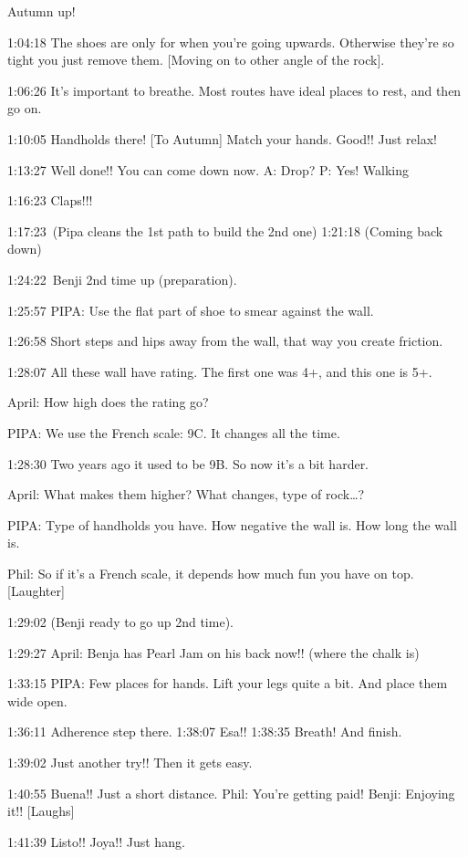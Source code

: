 Autumn up!

1:04:18 The shoes are only for when you're going upwards. Otherwise
they're so tight you just remove them. {[}Moving on to other angle of
the rock{]}.

1:06:26 It's important to breathe. Most routes have ideal places to
rest, and then go on.

1:10:05 Handholds there! {[}To Autumn{]} Match your hands. Good!! Just
relax!

1:13:27 Well done!! You can come down now. A: Drop? P: Yes! Walking

1:16:23 Claps!!!

1:17:23~(Pipa cleans the 1st path to build the 2nd one) 1:21:18 (Coming
back down)

1:24:22~Benji 2nd time up (preparation).

1:25:57 PIPA: Use the flat part of shoe to smear against the wall.

1:26:58 Short steps and hips away from the wall, that way you create
friction.

1:28:07 All these wall have rating. The first one was 4+, and this one
is 5+.

April: How high does the rating go?

PIPA: We use the French scale: 9C. It changes all the time.

1:28:30 Two years ago it used to be 9B. So now it's a bit harder.

April: What makes them higher? What changes, type of rock\ldots{}?

PIPA: Type of handholds you have. How negative the wall is. How long the
wall is.

Phil: So if it's a French scale, it depends how much fun you have on
top. {[}Laughter{]}

1:29:02 (Benji ready to go up 2nd time).

1:29:27 April: Benja has Pearl Jam on his back now!! (where the chalk
is)

1:33:15 PIPA: Few places for hands. Lift your legs quite a bit. And
place them wide open.

1:36:11 Adherence step there. 1:38:07 Esa!! 1:38:35 Breath! And finish.

1:39:02 Just another try!! Then it gets easy.

1:40:55 Buena!! Just a short distance. Phil: You're getting paid! Benji:
Enjoying it!! {[}Laughs{]}

1:41:39 Listo!! Joya!! Just hang.


